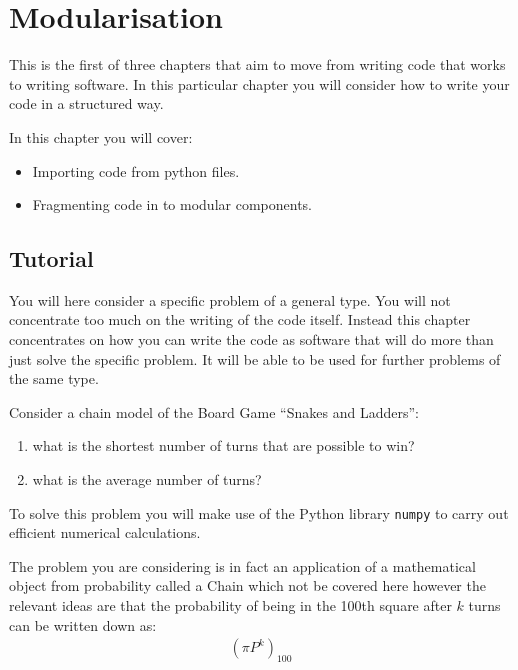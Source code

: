 \chapter{Modularisation}
\label{chp:modularisation}

This is the first of three chapters that aim to move from writing code
that works to writing software. In this particular chapter you will consider how
to write your code in a structured way.

In this chapter you will cover:
\begin{itemize}
    \item Importing code from python files.
    \item Fragmenting code in to modular components.
\end{itemize}


\section{Tutorial}
\label{sec:modularisation_tutorial}

You will here consider a specific problem of a general type. You will not
concentrate too much on the writing of the code itself. Instead this chapter
concentrates
on how you can write the code as software that will do more than just solve the
specific problem. It will be able to be used for further problems of the same
type.

Consider a  chain model of the Board Game ``Snakes and Ladders'':
\begin{enumerate}

\item 

what is the shortest number of turns that are possible to win?

\item 

what is the average number of turns?

\end{enumerate}

To solve this problem you will make use of the Python library \texttt{numpy}
to carry out efficient
numerical calculations.

The problem you are considering is in fact an application of a mathematical
object from probability called a  Chain which not be covered here 
however the relevant ideas are that the probability of being in the
100th square after \(k\) turns can be written down as:
\begin{equation*}
\begin{split}
    (\pi P ^ k)_{100}
\end{split}
\end{equation*}


